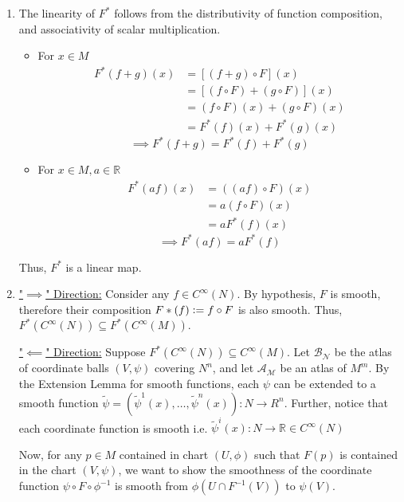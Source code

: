 \documentclass{article}
\newcommand{\R}{\mathbb{R}}
\newcommand{\defeq}{\vcentcolon=}
\begin{document}
\begin{enumerate}[label=(\alph*)]
  \item The linearity of $F^*$ follows from the distributivity of function composition, and associativity of scalar multiplication.
  
  \begin{itemize}
    \item For $x \in M$
    \begin{align*}
      F^*(f + g) (x) &= \left[\left( f + g \right) \circ F\right] (x) \\
      &= \left[\left( f \circ F \right) + \left( g \circ F \right)\right] (x) \\
      &= \left( f \circ F \right)(x) + \left( g \circ F \right)(x) \\
      &= F^*(f)(x) + F^*(g)(x)
    \end{align*}
    \[ \implies \boxed{F^*(f + g) = F^*(f) + F^*(g)} \]


    \vskip 0.25cm
    \item For $x \in M, a \in \R$
    \begin{align*}
      F^*(af)(x) &= \left( (af) \circ F \right)(x) \\
      &= a \left( f \circ F \right)(x) \\
      &= a F^*(f)(x)
    \end{align*}
    \[ \implies \boxed{F^*(af) = aF^*(f)} \]
  \end{itemize}
  Thus, $F^{*}$ is a linear map.

  \vskip 0.5cm
  \item \underline{"$\implies$" Direction:} Consider any $f \in C^{\infty}(N)$. By hypothesis, $F$ is smooth, therefore their composition $F*(f) \defeq f \circ F$ is also smooth. Thus, $F^*(C^{\infty}(N)) \subseteq F^*(C^{\infty}(M))$.
  
  \vskip 0.25cm
  \underline{"$\impliedby$" Direction:} 
  Suppose $F^*(C^{\infty}(N)) \subseteq C^{\infty}(M)$. Let $\mathcal{B_N}$ be the atlas of coordinate balls $(V, \psi)$ covering $N^n$, and let $\mathcal{A_M}$ be an atlas of $M^m$. By the Extension Lemma for smooth functions, each $\psi$ can be extended to a smooth function $\tilde{\psi} = \left( \tilde{\psi}^1(x), \dots, \tilde{\psi}^n(x) \right) : N \rightarrow R^n$. Further, notice that each coordinate function is smooth i.e. $\tilde{\psi}^i(x) : N \rightarrow \R \in C^{\infty}(N)$

  \vskip 0.25cm
  Now, for any $p \in M$ contained in chart $(U, \phi)$ such that $F(p)$ is contained in the chart $(V, \psi)$, we want to show the smoothness of the coordinate function $\psi \circ F \circ \phi^{-1}$ is smooth from $\phi(U \cap F^{-1}(V))$ to $\psi(V)$.


\end{enumerate}
\end{document}
